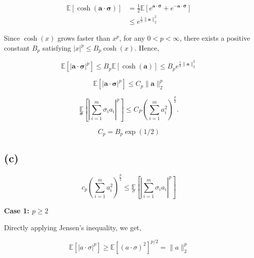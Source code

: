 \documentclass{article}
\begin{document}
\begin{equation}
    \begin{aligned}
        \mathbb{E}[\cosh (\bm{a} \cdot \bm{\sigma})] 
        &=\frac{1}{2} \mathbb{E}\left[e^{\bm{a} \cdot \bm{\sigma}}+e^{-\bm{a} \cdot \bm{\sigma}}\right] \\
        & \leq e^{\frac{1}{2} \|\bm{a}\|_{2}^{2}}
    \end{aligned}
\end{equation}

Since $\cosh (x)$ grows faster than $x^{p}$, for any $0<p<\infty$, there exists a positive constant $B_{p}$ satisfying $|x|^{p} \leq B_{p} \cosh (x)$. Hence,

\begin{equation}
    {\mathbb{E}\left[| \mathbf{a} \cdot \bm{\sigma} |^{p}\right]} \leq B_{p} \mathbb{E}[\cosh (\mathbf{a})] \leq B_{p} e^{\frac{1}{2} \|\mathbf{a}\|_{2}^{2}}
\end{equation}

\begin{equation}
    \mathbb{E}\left[|\mathbf{a} \cdot \bm{\sigma}|^{p}\right] \leq C_{p}\|\mathbf{a}\|_{2}^{p}
\end{equation}

\begin{equation}
    \underset{\mathbf{\sigma}}{\mathbb{E}}\left[\left|\sum_{i=1}^{m} \sigma_{i} a_{i}\right|^{p}\right] \leq C_P \left(\sum_{i=1}^{m} a_{i}^{2}\right)^{\frac{p}{2}}.
\end{equation}

\begin{equation}
    C_{p}= B_{p} \exp \left( 1/2\right)
\end{equation}

\newpage

\subsection{(c)}

\begin{equation}
    c_{p}\left(\sum_{i=1}^{m} a_{i}^{2}\right)^{\frac{p}{2}} \leq \underset{\sigma}{\mathbb{E}}\left[\left|\sum_{i=1}^{m} \sigma_{i} a_{i}\right|^{p}\right]
\end{equation}

\textbf{Case 1: $p \geq 2$}

Directly applying Jensen's inequality, we get,

\begin{equation}
    \mathbb{E}\left[|a \cdot \sigma|^{p}\right] \geq \mathbb{E}\left[(a \cdot \sigma)^{2}\right]^{p / 2}=\|a\|_{2}^{p}
\end{equation}
\end{document}
